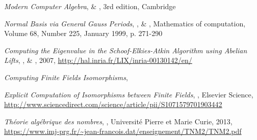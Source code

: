 \documentclass[a4paper]{article} %
\numberwithin{section}{part}
\numberwithin{equation}{section}
\begin{document}
\begin{thebibliography}{LC}
 \emph{Modern Computer Algebra},  \&
, 3rd edition, Cambridge

 \emph{Normal Basis \textup{via} General Gauss Periods},
,  \& , 
Mathematics of computation, Volume 68, Number 225, January 1999, p. 271-290

 \emph{Computing the Eigenvalue in the Schoof-Elkies-Atkin
Algorithm using Abelian Lifts}, ,  \&
, 2007, 
\url{http://hal.inria.fr/LIX/inria-00130142/en/}

 \emph{Computing Finite Fields Isomorphisms}, 

 \emph{Explicit Computation of Isomorphisms between Finite
Fields}, , Elsevier Science, 
\url{http://www.sciencedirect.com/science/article/pii/S1071579701903442}

 \emph{Théorie algébrique des nombres}, ,
Université Pierre et Marie Curie, 2013, 
\url{https://www.imj-prg.fr/~jean-francois.dat/enseignement/TNM2/TNM2.pdf}

\end{thebibliography}
\end{document}
